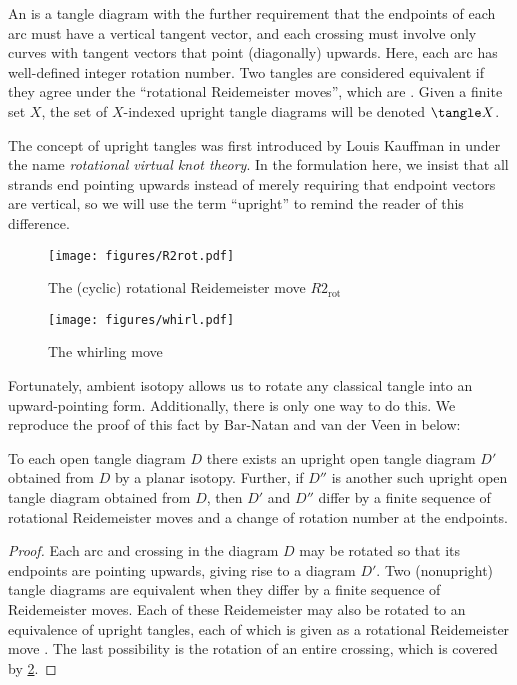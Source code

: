 \begin{definition}
        An  is a tangle diagram with the further
        requirement that the endpoints of each arc must have a vertical tangent
        vector, and each crossing must involve only curves with tangent vectors
        that point (diagonally) upwards. Here, each arc has well-defined integer
        rotation number. Two tangles are considered equivalent if they agree
        under the \enquote{rotational Reidemeister moves}, which are
        . Given a finite set $X$, the set of
        $X$-indexed upright tangle diagrams will be denoted $\tangle X$.
\end{definition}
\begin{remark}
        The concept of upright tangles was first introduced by Louis Kauffman in
        \cite{LK} under the name \emph{rotational virtual knot theory}. In the
        formulation here, we insist that all strands end pointing upwards
        instead of merely requiring that endpoint vectors are vertical, so we
        will use the term \enquote{upright} to remind the reader of this
        difference.
\end{remark}
\begin{figure}[h]
        \centering
        \texttt{[image: figures/R2rot.pdf]}
        \caption{The (cyclic) rotational Reidemeister move $R2_{\text{rot}}$}
        \label{fig:R2rot}
\end{figure}
\begin{figure}[h]
        \centering
        \texttt{[image: figures/whirl.pdf]}
        \caption{The whirling move}
        \label{fig:whirl}
\end{figure}

Fortunately, ambient isotopy allows us to rotate any classical tangle into an
upward-pointing form. Additionally, there is only one way to do this. We
reproduce the proof of this fact by Bar-Natan and van der Veen in \cite{BV}
below:

\begin{lemma}
        To each open tangle diagram $D$ there exists an upright open tangle
        diagram $D'$ obtained from $D$ by a planar isotopy. Further, if $D''$ is
        another such upright open tangle diagram obtained from $D$, then $D'$
        and $D''$ differ by a finite sequence of rotational Reidemeister moves
        and a change of rotation number at the endpoints.
\end{lemma}
\begin{proof}
        Each arc and crossing in the diagram $D$ may be rotated so that its
        endpoints are pointing upwards, giving rise to a diagram $D'$. Two
        (nonupright) tangle diagrams are equivalent when they differ by a finite
        sequence of Reidemeister moves. Each of these Reidemeister may also be
        rotated to an equivalence of upright tangles, each of which is given as
        a rotational Reidemeister move . The
        last possibility is the rotation of an entire crossing, which is covered
        by \cref{fig:whirl}.
\end{proof}

